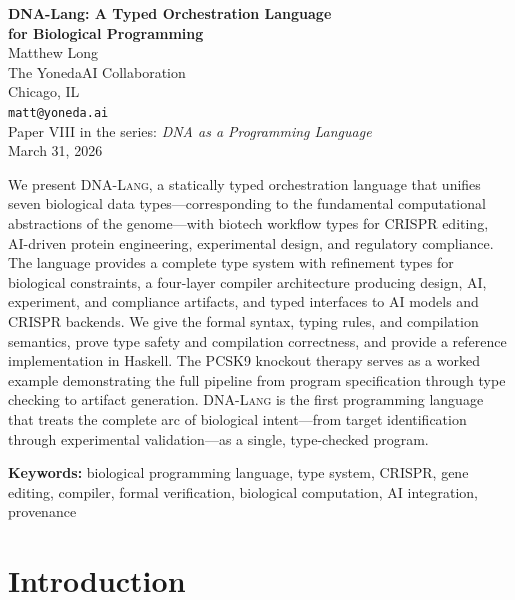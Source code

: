 \documentclass[12pt,a4paper]{article}
\newcommand{\DNALang}{\textsc{DNA-Lang}}
\begin{document}
\begin{center}
    {\LARGE\bfseries DNA-Lang: A Typed Orchestration Language\\[4pt] for Biological Programming}\\[18pt]
    {\large Matthew Long}\\[4pt]
    {\normalsize The YonedaAI Collaboration}\\
    {\normalsize Chicago, IL}\\[4pt]
    {\small\texttt{matt@yoneda.ai}}\\[18pt]
    {\normalsize Paper VIII in the series: \textit{DNA as a Programming Language}}\\[12pt]
    {\small March 31, 2026}
\end{center}

\begin{onecolabstract}
\noindent
We present \DNALang{}, a statically typed orchestration language that unifies seven biological data types---corresponding to the fundamental computational abstractions of the genome---with biotech workflow types for CRISPR editing, AI-driven protein engineering, experimental design, and regulatory compliance. The language provides a complete type system with refinement types for biological constraints, a four-layer compiler architecture producing design, AI, experiment, and compliance artifacts, and typed interfaces to AI models and CRISPR backends. We give the formal syntax, typing rules, and compilation semantics, prove type safety and compilation correctness, and provide a reference implementation in Haskell. The PCSK9 knockout therapy serves as a worked example demonstrating the full pipeline from program specification through type checking to artifact generation. \DNALang{} is the first programming language that treats the complete arc of biological intent---from target identification through experimental validation---as a single, type-checked program.
\end{onecolabstract}

\vspace{8pt}
\noindent\textbf{Keywords:} biological programming language, type system, CRISPR, gene editing, compiler, formal verification, biological computation, AI integration, provenance

\tableofcontents
\newpage

\section{Introduction}
\label{sec:intro}
\end{document}
